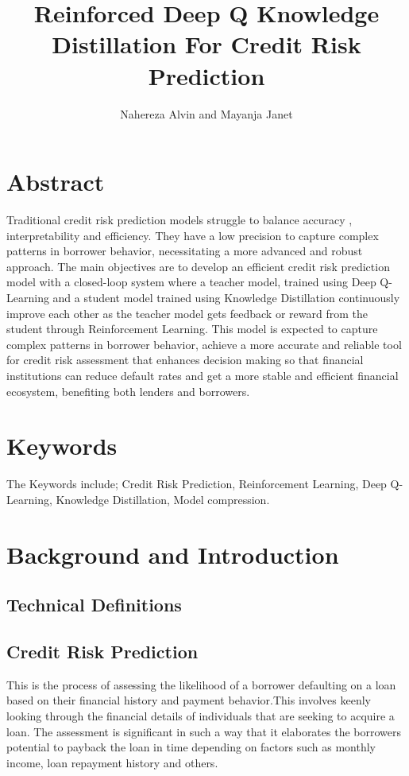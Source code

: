 \documentclass[8pt]{article}
\title{Reinforced Deep Q Knowledge Distillation For Credit Risk Prediction}
\author{Nahereza Alvin and Mayanja Janet}
\begin{document}
\maketitle

\section{Abstract}
Traditional credit risk prediction models struggle to balance accuracy , interpretability and efficiency. They have a low precision to capture complex patterns in borrower behavior, necessitating a more advanced and robust approach.  The main objectives are to develop an efficient credit risk prediction model  with a closed-loop system where a teacher model, trained using Deep Q-Learning and a student model trained using Knowledge Distillation continuously improve each other as the teacher model gets feedback or reward from the student through Reinforcement Learning. This model is expected to capture complex patterns in borrower behavior, achieve a more accurate and reliable tool for credit risk assessment that enhances decision making so that financial institutions can reduce default rates and get a more stable and efficient financial ecosystem, benefiting both lenders and borrowers.
\section{Keywords}
The Keywords include; Credit Risk Prediction, Reinforcement Learning, Deep Q-Learning, Knowledge Distillation, Model compression.

\section{Background and Introduction
}
\subsection{Technical Definitions}
\subsection{Credit Risk Prediction}
This is the process of assessing the likelihood of a borrower defaulting on a loan based on their financial history and payment behavior.This involves keenly looking through the financial details of individuals that are seeking to acquire a loan. The assessment is significant in such a way that it elaborates the borrowers potential to payback the loan in time depending on factors such as monthly income, loan repayment history and others.
\end{document}

